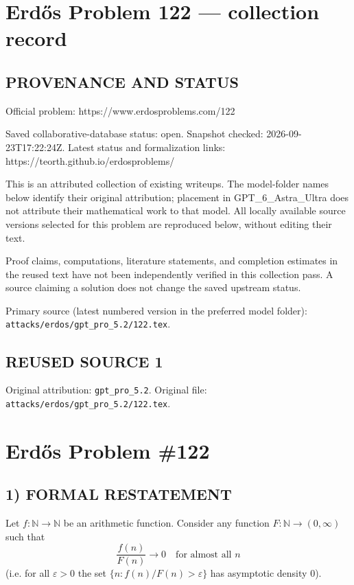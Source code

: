 \section*{Erd\H{o}s Problem 122 --- collection record}

\subsection*{PROVENANCE AND STATUS}
Official problem: https://www.erdosproblems.com/122

Saved collaborative-database status: open.
Snapshot checked: 2026-09-23T17:22:24Z.
Latest status and formalization links: https://teorth.github.io/erdosproblems/

This is an attributed collection of existing writeups. The model-folder names below identify their original attribution; placement in GPT\_6\_Astra\_Ultra does not attribute their mathematical work to that model. All locally available source versions selected for this problem are reproduced below, without editing their text.

Proof claims, computations, literature statements, and completion estimates in the reused text have not been independently verified in this collection pass. A source claiming a solution does not change the saved upstream status.

Primary source (latest numbered version in the preferred model folder): \texttt{attacks/erdos/gpt\_pro\_5.2/122.tex}.

\subsection*{REUSED SOURCE 1}
Original attribution: \texttt{gpt\_pro\_5.2}.
Original file: \texttt{attacks/erdos/gpt\_pro\_5.2/122.tex}.


\section*{Erd\H{o}s Problem \#122}

\subsection*{1) FORMAL RESTATEMENT}
Let $f:\mathbb N\to\mathbb N$ be an arithmetic function.  Consider any function $F:\mathbb N\to(0,\infty)$ such that
\[
\frac{f(n)}{F(n)}\to 0\quad\text{for almost all }n
\]
(i.e. for all $\varepsilon>0$ the set $\{n: f(n)/F(n)>\varepsilon\}$ has asymptotic density $0$).

